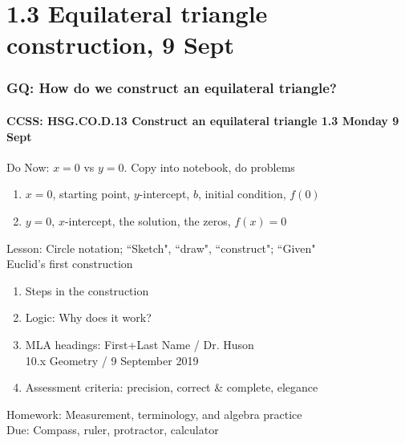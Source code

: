 \documentclass{beamer}
\begin{document}
\section{1.3 Equilateral triangle construction, 9 Sept}
\frame
{
  \frametitle{GQ: How do we construct an equilateral triangle?}
  \framesubtitle{CCSS: HSG.CO.D.13 Construct an equilateral triangle \hfill \alert{1.3 Monday 9 Sept}}

  \begin{block}{Do Now: $x=0$ vs $y=0$. Copy into notebook, do problems}
  \begin{enumerate}
      \item $x=0$, starting point, $y$-intercept, $b$, initial condition, $f(0)$
      \item $y=0$, $x$-intercept, the solution, the zeros, $f(x)=0$
  \end{enumerate}
  \end{block}
  Lesson: Circle notation; ``Sketch", ``draw", ``construct"; ``Given"\\[5pt]
  Euclid's first construction
  \begin{enumerate}
      \item Steps in the construction
      \item Logic: Why does it work?
      \item MLA headings: First+Last Name / Dr. Huson \\
      10.x Geometry / 9 September 2019
      \item Assessment criteria: precision, correct \& complete, elegance
  \end{enumerate}
  Homework: Measurement, terminology, and algebra practice\\
  Due: Compass, ruler, protractor, calculator
}
\end{document}
